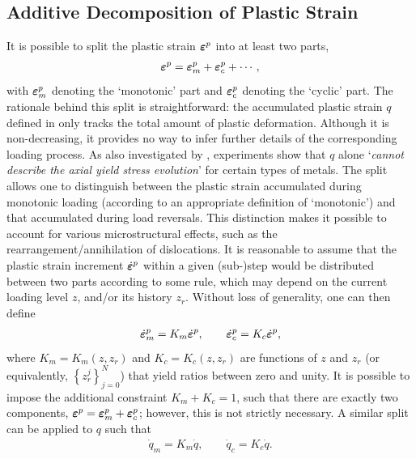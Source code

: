 \subsection{Additive Decomposition of Plastic Strain}
It is possible to split the plastic strain $\bm{\varepsilon}^p$ into at least two parts,
\begin{gather}\label{eq:split_ep}
    \bm{\varepsilon}^p=\bm{\varepsilon}^p_m+\bm{\varepsilon}^p_c+\cdots,
\end{gather}
with $\bm{\varepsilon}^p_m$ denoting the `monotonic' part and $\bm{\varepsilon}^p_c$ denoting the `cyclic' part.
The rationale behind this split is straightforward: the accumulated plastic strain $q$ defined in  only tracks the total amount of plastic deformation. Although it is non-decreasing, it provides no way to infer further details of the corresponding loading process.
As also investigated by \citet{Meyer2023}, experiments show that $q$ alone `\textit{cannot describe the axial yield stress evolution}' for certain types of metals.
The split  allows one to distinguish between the plastic strain accumulated during monotonic loading (according to an appropriate definition of `monotonic') and that accumulated during load reversals.
This distinction makes it possible to account for various microstructural effects, such as the rearrangement/annihilation of dislocations.
It is reasonable to assume that the plastic strain increment $\dot{\bm{\varepsilon}}^p$ within a given (sub-)step would be distributed between two parts according to some rule, which may depend on the current loading level $z$, and/or its history $z_r$.
Without loss of generality, one can then define
\begin{gather}\label{eq:split_q_definition}
    \dot{\bm{\varepsilon}}^p_m=K_m\dot{\bm{\varepsilon}}^p,\qquad\dot{\bm{\varepsilon}}^p_c=K_c\dot{\bm{\varepsilon}}^p,
\end{gather}
where $K_m=K_m\left(z,z_r\right)$ and $K_c=K_c\left(z,z_r\right)$ are functions of $z$ and $z_r$ (or equivalently, $\left\{z_r^j\right\}_{j=0}^N$) that yield ratios between zero and unity.
It is possible to impose the additional constraint $K_m+K_c=1$, such that there are exactly two components, $\bm{\varepsilon}^p=\bm{\varepsilon}^p_m+\bm{\varepsilon}^p_c$; however, this is not strictly necessary.
A similar split can be applied to $q$ such that
\begin{gather}\label{eq:split_q}
\boxed{\dot{q}_m=K_m\dot{q},\qquad\dot{q}_c=K_c\dot{q}.}
\end{gather}

